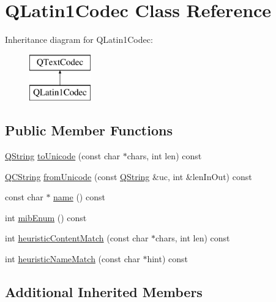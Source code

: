 \hypertarget{class_q_latin1_codec}{}\section{Q\+Latin1\+Codec Class Reference}
\label{class_q_latin1_codec}
Inheritance diagram for Q\+Latin1\+Codec\+:\begin{figure}[H]
\begin{center}
\leavevmode
\includegraphics[height=2.000000cm]{class_q_latin1_codec}
\end{center}
\end{figure}
\subsection*{Public Member Functions}
\begin{DoxyCompactItemize}
\item 
\mbox{\hyperlink{class_q_string}{Q\+String}} \mbox{\hyperlink{class_q_latin1_codec_a2445e543d9ddb637f8f94df3c1931a73}{to\+Unicode}} (const char $\ast$chars, int len) const
\item 
\mbox{\hyperlink{class_q_c_string}{Q\+C\+String}} \mbox{\hyperlink{class_q_latin1_codec_abb7f6a1587cc16a1641ce366dbdb3b52}{from\+Unicode}} (const \mbox{\hyperlink{class_q_string}{Q\+String}} \&uc, int \&len\+In\+Out) const
\item 
const char $\ast$ \mbox{\hyperlink{class_q_latin1_codec_ae85de05cd63fcb55c7fddceeb9d524d8}{name}} () const
\item 
int \mbox{\hyperlink{class_q_latin1_codec_a85348b77e2a1324f907a222b3a3d81d1}{mib\+Enum}} () const
\item 
int \mbox{\hyperlink{class_q_latin1_codec_a6d2af26fea72aee95f3f07049deeb72c}{heuristic\+Content\+Match}} (const char $\ast$chars, int len) const
\item 
int \mbox{\hyperlink{class_q_latin1_codec_a34f0298855e849d6c4bd67a7115971ec}{heuristic\+Name\+Match}} (const char $\ast$hint) const
\end{DoxyCompactItemize}
\subsection*{Additional Inherited Members}



